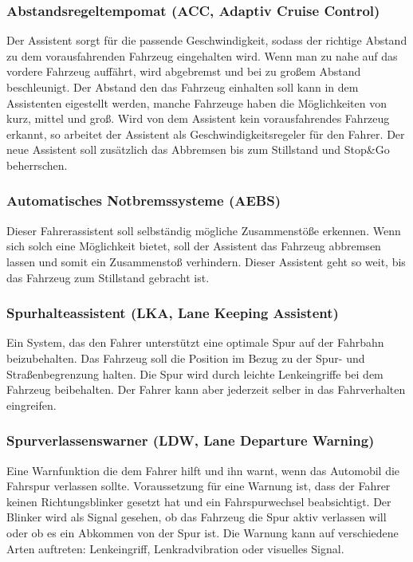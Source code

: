         \subsubsection{Abstandsregeltempomat (ACC, Adaptiv Cruise Control)}
        Der Assistent sorgt für die passende Geschwindigkeit, sodass der richtige Abstand
        zu dem vorausfahrenden Fahrzeug eingehalten wird. Wenn man zu nahe auf das vordere
        Fahrzeug auffährt, wird abgebremst und bei zu großem Abstand beschleunigt. Der Abstand
        den das Fahrzeug einhalten soll kann in dem Assistenten eigestellt werden, manche Fahrzeuge
        haben die Möglichkeiten von kurz, mittel und groß. Wird von dem Assistent kein vorausfahrendes
        Fahrzeug erkannt, so arbeitet der Assistent als Geschwindigkeitsregeler für den Fahrer. Der
        neue Assistent soll zusätzlich das Abbremsen bis zum Stillstand und Stop\&Go beherrschen.
        ~\cite{assistenzsysteme.PB2} ~\cite{Audi.PB1}

        \subsubsection{Automatisches Notbremssysteme (AEBS)}
        Dieser Fahrerassistent soll selbständig mögliche Zusammenstöße erkennen. Wenn sich solch
        eine Möglichkeit bietet, soll der Assistent das Fahrzeug abbremsen lassen und somit ein
        Zusammenstoß verhindern. Dieser Assistent geht so weit, bis das Fahrzeug zum Stillstand 
        gebracht ist.
        ~\cite{notbremsassi.PB1} ~\cite{assistenzsysteme.PB1}  ~\cite{assistenzsysteme.PB2}
        ~\cite{notbremsassi.PB2}
        
        \subsubsection{Spurhalteassistent (LKA, Lane Keeping Assistent)}
        Ein System, das den Fahrer unterstützt eine optimale Spur auf der Fahrbahn beizubehalten.
        Das Fahrzeug soll die Position im Bezug zu der Spur- und Straßenbegrenzung halten. Die
        Spur wird durch leichte Lenkeingriffe bei dem Fahrzeug beibehalten. Der Fahrer kann aber
        jederzeit selber in das Fahrverhalten eingreifen.
        ~\cite{spurhalte.PB1} ~\cite{assistenzsysteme.PB1} ~\cite{spurhalte.PB2}  ~\cite{assistenzsysteme.PB2}

        \subsubsection{Spurverlassenswarner (LDW, Lane Departure Warning)}
        Eine Warnfunktion die dem Fahrer hilft und ihn warnt, wenn das Automobil die Fahrspur
        verlassen sollte. Voraussetzung für eine Warnung ist, dass der Fahrer keinen Richtungsblinker
        gesetzt hat und ein Fahrspurwechsel beabsichtigt. Der Blinker wird als Signal gesehen, ob das 
        Fahrzeug die Spur aktiv verlassen will oder ob es ein Abkommen von der Spur ist. Die 
        Warnung kann auf verschiedene Arten auftreten: Lenkeingriff, Lenkradvibration oder visuelles
        Signal.
        ~\cite{assistenzsysteme.PB2} ~\cite{LDW.PB1}

